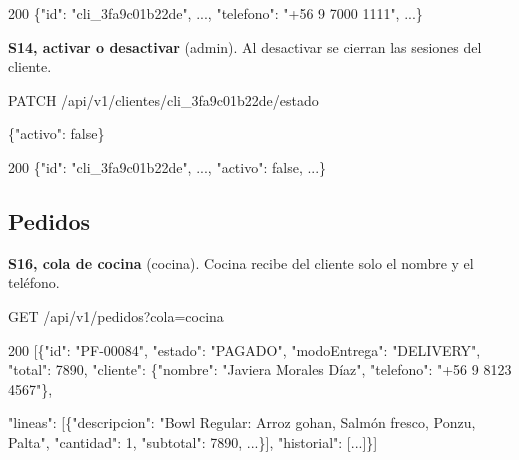 \begin{codigo}
200 \{"id":\allowbreak{} "cli\_\allowbreak{}3fa9c01b22de",\allowbreak{} .\allowbreak{}.\allowbreak{}.\allowbreak{},\allowbreak{} "telefono":\allowbreak{} "+56 9 7000 1111",\allowbreak{} .\allowbreak{}.\allowbreak{}.\allowbreak{}\}\par
\end{codigo}

\textbf{S14, activar o desactivar} (admin). Al desactivar se cierran las sesiones del cliente.


\begin{codigo}
PATCH /\allowbreak{}api/\allowbreak{}v1/\allowbreak{}clientes/\allowbreak{}cli\_\allowbreak{}3fa9c01b22de/\allowbreak{}estado\par
\{"activo":\allowbreak{} false\}\par
\end{codigo}

\begin{codigo}
200 \{"id":\allowbreak{} "cli\_\allowbreak{}3fa9c01b22de",\allowbreak{} .\allowbreak{}.\allowbreak{}.\allowbreak{},\allowbreak{} "activo":\allowbreak{} false,\allowbreak{} .\allowbreak{}.\allowbreak{}.\allowbreak{}\}\par
\end{codigo}

\subsection{Pedidos}

\textbf{S16, cola de cocina} (cocina). Cocina recibe del cliente solo el nombre y el teléfono.


\begin{codigo}
GET /\allowbreak{}api/\allowbreak{}v1/\allowbreak{}pedidos?\allowbreak{}cola=\allowbreak{}cocina\par
\end{codigo}

\begin{codigo}
200 [\allowbreak{}\{"id":\allowbreak{} "PF-\allowbreak{}00084",\allowbreak{} "estado":\allowbreak{} "PAGADO",\allowbreak{} "modoEntrega":\allowbreak{} "DELIVERY",\allowbreak{} "total":\allowbreak{} 7890,\allowbreak{} "cliente":\allowbreak{} \{"nombre":\allowbreak{} "Javiera Morales Díaz",\allowbreak{} "telefono":\allowbreak{} "+56 9 8123 4567"\},\allowbreak{}\par
\hspace*{6\ttw}"lineas":\allowbreak{} [\allowbreak{}\{"descripcion":\allowbreak{} "Bowl Regular:\allowbreak{} Arroz gohan,\allowbreak{} Salmón fresco,\allowbreak{} Ponzu,\allowbreak{} Palta",\allowbreak{} "cantidad":\allowbreak{} 1,\allowbreak{} "subtotal":\allowbreak{} 7890,\allowbreak{} .\allowbreak{}.\allowbreak{}.\allowbreak{}\}],\allowbreak{} "historial":\allowbreak{} [\allowbreak{}.\allowbreak{}.\allowbreak{}.\allowbreak{}]\}]\par
\end{codigo}

